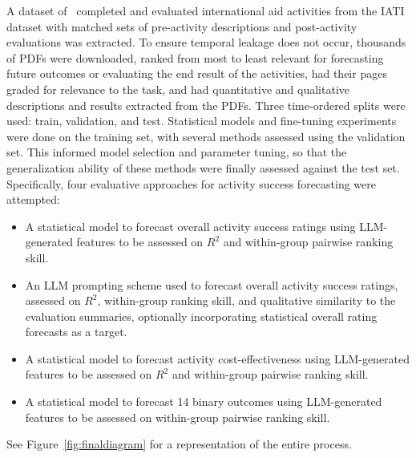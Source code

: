 \documentclass[12pt,a4paper]{article}
\begin{document}
A dataset of \NOverallRatings\ completed and evaluated international aid activities from the IATI dataset with matched sets of pre-activity descriptions and post-activity evaluations was extracted. To ensure temporal leakage does not occur, thousands of PDFs were downloaded, ranked from most to least relevant for forecasting future outcomes or evaluating the end result of the activities, had their pages graded for relevance to the task, and had quantitative and qualitative descriptions and results extracted from the PDFs. Three time-ordered splits were used: train, validation, and test. Statistical models and fine-tuning experiments were done on the training set, with several methods assessed using the validation set. This informed model selection and parameter tuning, so that the generalization ability of these methods were finally assessed against the test set. Specifically, four evaluative approaches for activity success forecasting were attempted:
\begin{itemize}
\item A statistical model to forecast overall activity success ratings using LLM-generated features to be assessed on $R^2$ and within-group pairwise ranking skill.
\item An LLM prompting scheme used to forecast overall activity success ratings, assessed on $R^2$, within-group ranking skill, and qualitative similarity to the evaluation summaries, optionally incorporating statistical overall rating forecasts as a target.
\item A statistical model to forecast activity cost-effectiveness using LLM-generated features to be assessed on $R^2$ and within-group pairwise ranking skill.
\item A statistical model to forecast 14 binary outcomes using LLM-generated features to be assessed on within-group pairwise ranking skill.
\end{itemize}

See Figure~\ref{fig:finaldiagram} for a representation of the entire process.
\end{document}
